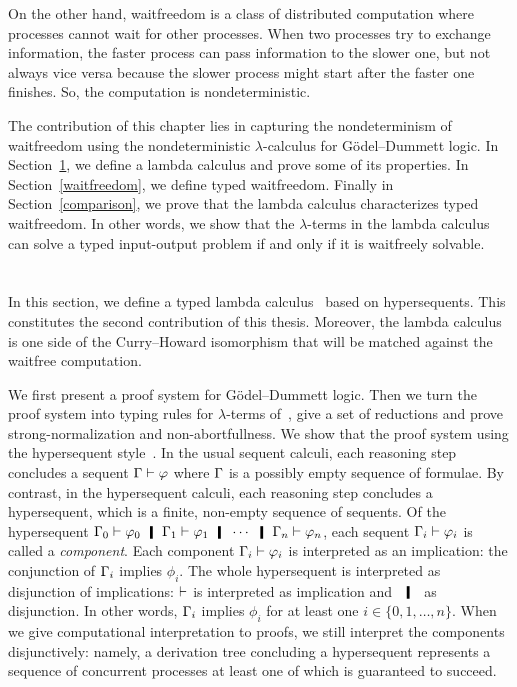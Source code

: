 On the other hand, waitfreedom is a class of distributed computation
where processes cannot wait for other processes.  When two processes try
to exchange information, the faster process can pass information to the
slower one, but not always vice versa because the slower process might
start after the faster one finishes.
So, the computation is nondeterministic.

The contribution of this chapter lies in capturing
the nondeterminism of waitfreedom using the nondeterministic
$\lambda$-calculus for G\"odel--Dummett logic.
In Section~\ref{lgd},
we define a lambda calculus and prove some of its properties.
In Section~\ref{waitfreedom}, we define typed waitfreedom.
Finally in Section~\ref{comparison},
we prove that the lambda calculus characterizes typed waitfreedom.
In other words, we show that the
$\lambda$-terms in the lambda calculus can solve a typed input-output
problem if and only if it is waitfreely solvable.

\section{\lgd}
\label{lgd}

In this section, we define a typed lambda calculus \lgd\, based on
hypersequents.
This constitutes the second contribution of this thesis.
Moreover, the lambda calculus is one side of the Curry--Howard
isomorphism that will be matched against the waitfree computation.

We first present a proof system for G\"odel--Dummett logic.
Then we turn the proof system into typing rules for $\lambda$-terms
of~\lgd, give a set of reductions and prove strong-normalization and
non-abortfullness.
We show that the proof system using the hypersequent
style~\citep{avron91}.
In the usual sequent calculi, each reasoning step concludes a sequent
$\Gamma\vdash\varphi$ where $\Gamma$ is a possibly empty sequence of formulae.
By contrast,
in the hypersequent calculi, each reasoning step concludes a
hypersequent, which is a finite, non-empty sequence of sequents.
Of the hypersequent
$\G_0\vdash\phi_0\hmid\G_1\vdash\phi_1\hmid\cdots\hmid\G_n\vdash\phi_n$,
each sequent $\Gamma_i\vdash\varphi_i$ is called a
\textit{component}.
Each component $\Gamma_i\vdash\varphi_i$ is interpreted as an implication: the
conjunction of $\Gamma_i$ implies $\phi_i$.
The whole hypersequent is interpreted as disjunction of implications:
$\vdash$ is interpreted as implication and $\hmid$ as
disjunction.
In other words, $\Gamma_i$ implies $\phi_i$ for at least one $i\in
\{0,1,\ldots,n\}$.
When we give computational interpretation to proofs, we still interpret
the components
disjunctively: namely, a derivation tree concluding a hypersequent
represents a sequence of concurrent processes at least one of which is
guaranteed to succeed.

